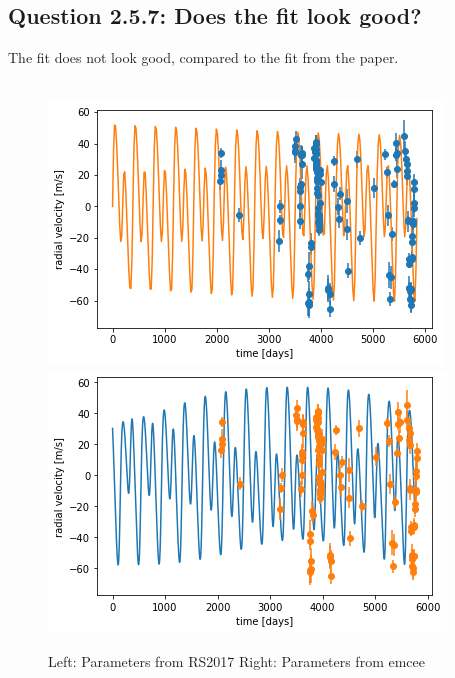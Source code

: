 \documentclass{article}
\begin{document}
\subsection{Question 2.5.7: Does the fit look good?}
The fit does not look good, compared to the fit from the paper. 
\\\\
\begin{figure}[!h]
    \includegraphics[scale=0.5]{output.png}
\includegraphics[scale=0.5]{output2.png}
  \caption{Left: Parameters from  RS2017 Right: Parameters from  emcee}
\end{figure}
\end{document}
